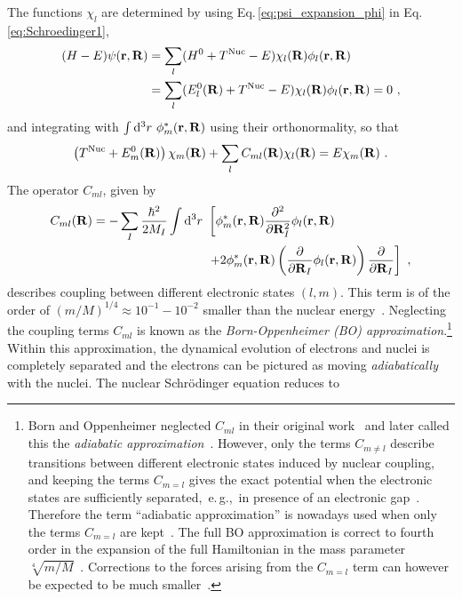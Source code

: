 The functions $\chi_l$ are determined by using Eq.\,\eqref{eq:psi_expansion_phi} in Eq.\,\eqref{eq:Schroedinger1},
\begin{align}
    (H - E) \psi ({\bf r}, {\bf R})
        & = \sum_l (H^0 + T^{\rm Nuc} - E) \chi_l ({\bf R}) \phi_l ({\bf r}, {\bf R}) \nonumber \\
        &= \sum_l (E^0_l({\bf R}) + T^{\rm Nuc} - E) \chi_l ({\bf R}) \phi_l ({\bf r}, {\bf R}) = 0~,
\end{align}
and integrating with $\int {\rm d}^3 r ~ \phi^\ast_m ({\bf r}, {\bf R})$ using their orthonormality, so that
\begin{align}
    \left( T^{\rm Nuc} + E^0_m({\bf R}) \right) \chi_m ({\bf R})
        + \sum_l C_{ml} ({\bf R}) \chi_l ({\bf R})
        = E \chi_m ({\bf R})~.
    \label{eq:chi1}
\end{align}
The operator $C_{ml}$, given by
\begin{align}
    C_{ml} ({\bf R})
        = - \sum_I \frac{\hbar^2}{2 M_I} \int \d^3 r ~ 
        &\left[ \phi^\ast_m ({\bf r}, {\bf R}) \frac{\partial^2}{\partial {\bf R}_I^2}
            \phi_l ({\bf r}, {\bf R}) \right. \nonumber \\
        &\left.
            + 2 \phi^\ast_m ({\bf r}, {\bf R}) \left(
                \frac{\partial}{\partial {\bf R}_I} \phi_l ({\bf r}, {\bf R}) \right)
            \frac{\partial}{\partial {\bf R}_I}
        \right]~,
    \label{eq:Aml}
\end{align}
describes coupling between different electronic states $(l, m)$. This term is of the order of $(m/M)^{1/4} \approx 10^{-1} - 10^{-2}$ smaller than the nuclear energy~\cite{BornOppenheimer}. Neglecting the coupling terms $C_{ml}$ is known as the \emph{Born-Oppenheimer (BO) approximation}.\footnote[][0em]{Born and Oppenheimer neglected $C_{ml}$ in their original work~\cite{BornOppenheimer} and later called this the \emph{adiabatic approximation}~\cite{BornHuang}. However, only the terms $C_{m \neq l}$ describe transitions between different electronic states induced by nuclear coupling, and keeping the terms $C_{m=l}$ gives the exact potential when the electronic states are sufficiently separated,~e.\,g.,~in presence of an electronic gap~\cite{Born1951kopplung}. Therefore the term ``adiabatic approximation'' is nowadays used when only the terms $C_{m=l}$ are kept~\cite{Marx2009}. The full BO approximation is correct to fourth order in the expansion of the full Hamiltonian in the mass parameter $\sqrt[4]{m/M}$~\cite{BornHuang}. Corrections to the forces arising from the $C_{m=l}$ term can however be expected to be much smaller~\cite{Ziman1955}.
} Within this approximation, the dynamical evolution of electrons and nuclei is completely separated and the electrons can be pictured as moving \emph{adiabatically} with the nuclei. The nuclear Schr\"odinger equation reduces to
